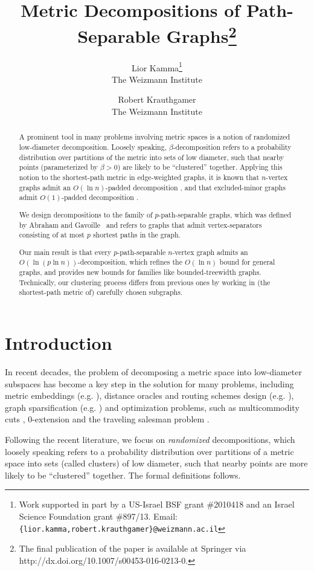 \documentclass[11pt,fleqn]{article}
\title{Metric Decompositions of Path-Separable Graphs\thanks{The final publication of the paper is available at Springer via http://dx.doi.org/10.1007/s00453-016-0213-0.}}
\author{Lior Kamma\thanks{Work supported in part by a US-Israel BSF grant \#2010418
and an Israel Science Foundation grant \#897/13.
Email: \texttt{\{lior.kamma,robert.krauthgamer\}@weizmann.ac.il}
}
\\ The Weizmann Institute
\and Robert Krauthgamer\footnotemark[\value{footnote}]
\\ The Weizmann Institute
}
\begin{document}
\maketitle

\begin{abstract}
A prominent tool in many problems involving metric spaces is 
a notion of randomized low-diameter decomposition.
Loosely speaking, $\beta$-decomposition refers to a probability distribution 
over partitions of the metric into sets of low diameter, 
such that nearby points (parameterized by $\beta>0$)
are likely to be ``clustered'' together.
Applying this notion to the shortest-path metric in edge-weighted graphs,
it is known that $n$-vertex graphs admit 
an $O(\ln n)$-padded decomposition \cite{Bartal96},
and that excluded-minor graphs admit $O(1)$-padded decomposition 
\cite{KPR93,FT03,AGGNT14}.

We design decompositions to the family of $p$-path-separable graphs,
which was defined by Abraham and Gavoille~\cite{AG06}
and refers to graphs that admit vertex-separators consisting 
of at most $p$ shortest paths in the graph.

Our main result is that every $p$-path-separable $n$-vertex graph 
admits an $O(\ln (p \ln n))$-decomposition,
which refines the $O(\ln n)$ bound for general graphs, 
and provides new bounds for families like bounded-treewidth graphs.
Technically, our clustering process differs from previous ones 
by working in (the shortest-path metric of) carefully chosen subgraphs.
\end{abstract}


\section{Introduction} \label{sec:intro}
In recent decades, the problem of decomposing a metric space into low-diameter subspaces has become a key step in the solution for many problems, including metric embeddings (e.g. \cite{Assouad83,Bartal96,Rao99,GKL03,FRT04,KLMN05}), distance oracles and routing schemes design (e.g. \cite{AP90,DSB97,Talwar04,CGMZ05,MN07}), graph sparsification (e.g. \cite{EGKRTT2010,KKN14}) and optimization problems, such as multicommodity cuts \cite{KPR93,GVY96,LR99}, $0$-extension \cite{CKR04} and the traveling salesman problem \cite{Talwar04}.

Following the recent literature, we focus on \emph{randomized} decompositions, which loosely speaking refers to a probability distribution over partitions 
of a metric space into sets (called clusters) of low diameter, 
such that nearby points are more likely to be ``clustered'' together.
The formal definitions follows.
\end{document}

